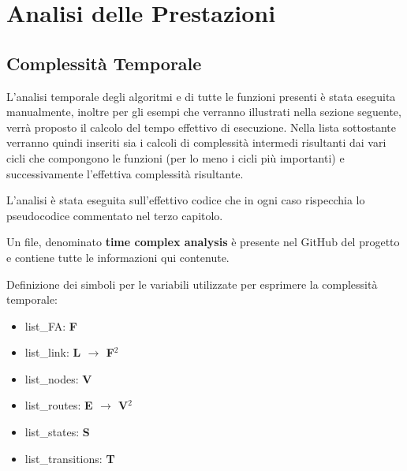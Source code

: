 \section{Analisi delle Prestazioni}
\subsection{Complessità Temporale}
L'analisi temporale degli algoritmi e di tutte le funzioni presenti è stata eseguita manualmente, inoltre per gli esempi che verranno illustrati nella sezione seguente, verrà proposto il calcolo del tempo effettivo di esecuzione.
Nella lista sottostante verranno quindi inseriti sia i calcoli di complessità intermedi risultanti dai vari cicli che compongono le funzioni (per lo meno i cicli più importanti) e successivamente l'effettiva complessità risultante.

L'analisi è stata eseguita sull'effettivo codice che in ogni caso rispecchia lo pseudocodice commentato nel terzo capitolo.

Un file, denominato \textbf{time complex analysis} è presente nel GitHub del progetto e contiene tutte le informazioni qui contenute.

Definizione dei simboli per le variabili utilizzate per esprimere la complessità temporale:
\begin{itemize}
    \item list\_FA: \textbf{F}
    \item list\_link: \textbf{L $\rightarrow$ F$^2$}
    \item list\_nodes: \textbf{V} 
    \item list\_routes: \textbf{E  $\rightarrow$ V$^2$}
    \item list\_states: \textbf{S}
    \item list\_transitions: \textbf{T}
\end{itemize}


